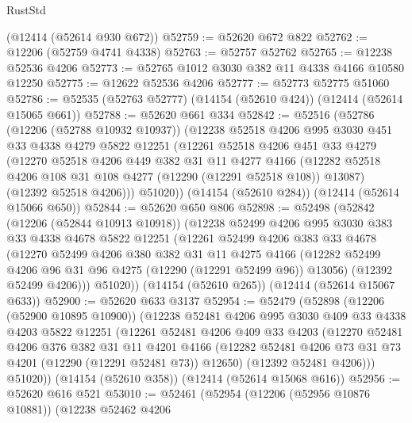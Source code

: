 \begin{lexlean}{RustStd}
\begin{coremodule}
{\begin{coremodule}
{{{{{{{{{{{{{{{{{{{{{{{{{{{{{{{{{{{{{{{{{{{{{{{{{{    (@12414 (@52614 @930 @672))
@52759 := @52620 @672 @822
@52762 := @12206 (@52759 @4741 @4338)
@52763 := @52757 @52762
@52765 := @12238 @52536 @4206
@52773 := @52765 @1012 @3030 @382 @11 @4338 @4166 @10580 @12250
@52775 := @12622 @52536 @4206
@52777 := @52773 @52775 @51060
@52786 := @52535 (@52763 @52777) (@14154 (@52610 @424)) (@12414 (@52614 @15065 @661))
@52788 := @52620 @661 @334
@52842 := @52516
    (@52786
      (@12206 (@52788 @10932 @10937))
      (@12238
        @52518
        @4206
        @995
        @3030
        @451
        @33
        @4338
        @4279
        @5822
        @12251
        (@12261
          @52518
          @4206
          @451
          @33
          @4279
          (@12270
            @52518
            @4206
            @449
            @382
            @31
            @11
            @4277
            @4166
            (@12282 @52518 @4206 @108 @31 @108 @4277 (@12290 (@12291 @52518 @108)) @13087)
            (@12392 @52518 @4206)))
        @51020))
    (@14154 (@52610 @284))
    (@12414 (@52614 @15066 @650))
@52844 := @52620 @650 @806
@52898 := @52498
    (@52842
      (@12206 (@52844 @10913 @10918))
      (@12238
        @52499
        @4206
        @995
        @3030
        @383
        @33
        @4338
        @4678
        @5822
        @12251
        (@12261
          @52499
          @4206
          @383
          @33
          @4678
          (@12270
            @52499
            @4206
            @380
            @382
            @31
            @11
            @4275
            @4166
            (@12282 @52499 @4206 @96 @31 @96 @4275 (@12290 (@12291 @52499 @96)) @13056)
            (@12392 @52499 @4206)))
        @51020))
    (@14154 (@52610 @265))
    (@12414 (@52614 @15067 @633))
@52900 := @52620 @633 @3137
@52954 := @52479
    (@52898
      (@12206 (@52900 @10895 @10900))
      (@12238
        @52481
        @4206
        @995
        @3030
        @409
        @33
        @4338
        @4203
        @5822
        @12251
        (@12261
          @52481
          @4206
          @409
          @33
          @4203
          (@12270
            @52481
            @4206
            @376
            @382
            @31
            @11
            @4201
            @4166
            (@12282 @52481 @4206 @73 @31 @73 @4201 (@12290 (@12291 @52481 @73)) @12650)
            (@12392 @52481 @4206)))
        @51020))
    (@14154 (@52610 @358))
    (@12414 (@52614 @15068 @616))
@52956 := @52620 @616 @521
@53010 := @52461
    (@52954
      (@12206 (@52956 @10876 @10881))
      (@12238
        @52462
        @4206
}}}}}}}}}}}}}}}}}}}}}}}}}}}}}}}}}}}}}}}}}}}}}}}}}}
\end{coremodule}}
\end{coremodule}
\end{lexlean}
